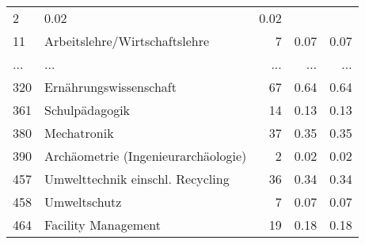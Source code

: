 \begin{longtable}{lXrrr}
          \num{2} &
          \num[round-mode=places,round-precision=2]{0,02} &
          \num[round-mode=places,round-precision=2]{0,02} \\
        11 & \multicolumn{1}{X}{Arbeitslehre/Wirtschaftslehre} & %
          \num{7} &
          \num[round-mode=places,round-precision=2]{0,07} &
          \num[round-mode=places,round-precision=2]{0,07} \\
       ... & ... & ... & ... & ... \\
        320 & \multicolumn{1}{X}{Ernährungswissenschaft} & %
          \num{67} &
          \num[round-mode=places,round-precision=2]{0,64} &
          \num[round-mode=places,round-precision=2]{0,64} \\

        361 & \multicolumn{1}{X}{Schulpädagogik} & %
          \num{14} &
          \num[round-mode=places,round-precision=2]{0,13} &
          \num[round-mode=places,round-precision=2]{0,13} \\

        380 & \multicolumn{1}{X}{Mechatronik} & %
          \num{37} &
          \num[round-mode=places,round-precision=2]{0,35} &
          \num[round-mode=places,round-precision=2]{0,35} \\

        390 & \multicolumn{1}{X}{Archäometrie (Ingenieurarchäologie)} & %
          \num{2} &
          \num[round-mode=places,round-precision=2]{0,02} &
          \num[round-mode=places,round-precision=2]{0,02} \\

        457 & \multicolumn{1}{X}{Umwelttechnik einschl. Recycling} & %
          \num{36} &
          \num[round-mode=places,round-precision=2]{0,34} &
          \num[round-mode=places,round-precision=2]{0,34} \\

        458 & \multicolumn{1}{X}{Umweltschutz} & %
          \num{7} &
          \num[round-mode=places,round-precision=2]{0,07} &
          \num[round-mode=places,round-precision=2]{0,07} \\

        464 & \multicolumn{1}{X}{Facility Management} & %
          \num{19} &
          \num[round-mode=places,round-precision=2]{0,18} &
          \num[round-mode=places,round-precision=2]{0,18} \\


\end{longtable}
